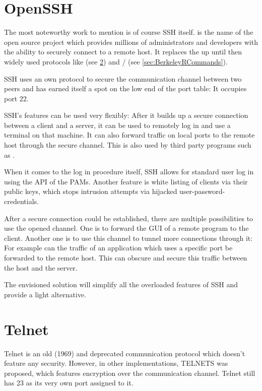 \documentclass[10pt,a4paper,titlepage,twoside,english,final]{zhawreprt}
\begin{document}
\section{OpenSSH}\label{sec:OpenSSH}
The most noteworthy work to mention is of course \gls{SSH} itself.
\cite{openssh} is the name of the open source project which provides millions of administrators and developers with the ability to securely connect to a remote host.
It replaces the up until then widely used protocols like \cite{telnet} (see \ref{sec:Telnet}) and \cite{rlogin}/\cite{rsh} (see \ref{sec:BerkeleyRCommands}).

\gls{SSH} uses an own protocol to secure the communication channel between two peers and has earned itself a spot on the low end of the \gls{port} table:
It occupies \gls{port} 22.

\gls{SSH}'s features can be used very flexibly:
After it builds up a secure connection between a client and a server, it can be used to remotely log in and use a \gls{terminal} on that machine.
It can also forward traffic on local ports to the remote host through the secure channel.
This is also used by third party programs such as \cite{rsync}.

When it comes to the log in procedure itself, \gls{SSH} allows for standard user log in using the \gls{API} of the \glspl{PAM}.
Another feature is white listing of clients via their public keys, which stops intrusion attempts via hijacked user-password-credentials.

After a secure connection could be established, there are multiple possibilities to use the opened channel.
One is to forward the \gls{GUI} of a remote program to the client.
Another one is to use this channel to tunnel more connections through it:
For example can the traffic of an application which uses a specific \gls{port} be forwarded to the remote host.
This can obscure and secure this traffic between the host and the server.

The envisioned solution will simplify all the overloaded features of \gls{SSH} and provide a light alternative.

\section{Telnet}\label{sec:Telnet}
Telnet \citep{rfc15,rfc854} is an old (1969) and deprecated communication protocol which doesn't feature any security.
However, in other implementations, \gls{TELNETS} was proposed, which features encryption over the communication channel.
Telnet still has 23 as its very own \gls{port} assigned to it.
\end{document}
